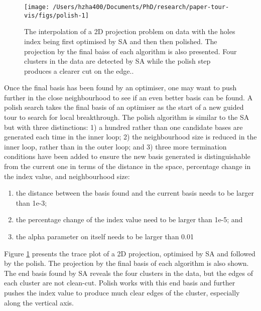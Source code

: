 \begin{Schunk}
\begin{figure}

{\centering \texttt{[image: /Users/hzha400/Documents/PhD/research/paper-tour-vis/figs/polish-1]} 

}

\caption[The interpolation of a 2D projection problem on  data with the holes index being first optimised by SA and then then polished]{The interpolation of a 2D projection problem on  data with the holes index being first optimised by SA and then then polished. The projection by the final baiss of each algorithm is also presented. Four clusters in the data are detected by SA while the polish step produces a clearer cut on the edge..}\label{fig:polish}
\end{figure}
\end{Schunk}

Once the final basis has been found by an optimiser, one may want to
push further in the close neighbourhood to see if an even better basis
can be found. A polish search takes the final basis of an optimiser as
the start of a new guided tour to search for local breakthrough. The
polish algorithm is similar to the SA but with three distinctions: 1) a
hundred rather than one candidate bases are generated each time in the
inner loop; 2) the neighbourhood size is reduced in the inner loop,
rather than in the outer loop; and 3) three more termination conditions
have been added to ensure the new basis generated is distinguishable
from the current one in terms of the distance in the space, percentage
change in the index value, and neighbourhood size:

\begin{enumerate}
\def\labelenumi{\arabic{enumi})}
\tightlist
\item
  the distance between the basis found and the current basis needs to be
  larger than 1e-3;
\item
  the percentage change of the index value need to be larger than 1e-5;
  and
\item
  the alpha parameter on itself needs to be larger than 0.01
\end{enumerate}

Figure \ref{fig:polish} presents the trace plot of a 2D projection,
optimised by SA and followed by the polish. The projection by the final
basis of each algorithm is also shown. The end basis found by SA reveals
the four clusters in the data, but the edges of each cluster are not
clean-cut. Polish works with this end basis and further pushes the index
value to produce much clear edges of the cluster, especially along the
vertical axis.

